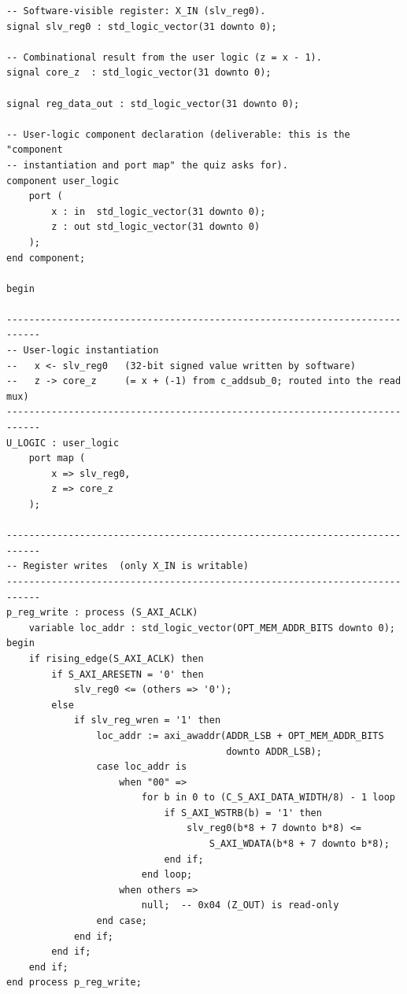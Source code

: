 \documentclass[11pt,letterpaper]{article}
\begin{document}
\begin{lstlisting}[caption={\texttt{add\_const\_axi\_v1\_0\_S00\_AXI.vhd} --
                   user\_logic component declaration, instantiation, and
                   read mux},label={lst:slv}]
-- Software-visible register: X_IN (slv_reg0).
signal slv_reg0 : std_logic_vector(31 downto 0);

-- Combinational result from the user logic (z = x - 1).
signal core_z  : std_logic_vector(31 downto 0);

signal reg_data_out : std_logic_vector(31 downto 0);

-- User-logic component declaration (deliverable: this is the "component
-- instantiation and port map" the quiz asks for).
component user_logic
    port (
        x : in  std_logic_vector(31 downto 0);
        z : out std_logic_vector(31 downto 0)
    );
end component;

begin

----------------------------------------------------------------------------
-- User-logic instantiation
--   x <- slv_reg0   (32-bit signed value written by software)
--   z -> core_z     (= x + (-1) from c_addsub_0; routed into the read mux)
----------------------------------------------------------------------------
U_LOGIC : user_logic
    port map (
        x => slv_reg0,
        z => core_z
    );

----------------------------------------------------------------------------
-- Register writes  (only X_IN is writable)
----------------------------------------------------------------------------
p_reg_write : process (S_AXI_ACLK)
    variable loc_addr : std_logic_vector(OPT_MEM_ADDR_BITS downto 0);
begin
    if rising_edge(S_AXI_ACLK) then
        if S_AXI_ARESETN = '0' then
            slv_reg0 <= (others => '0');
        else
            if slv_reg_wren = '1' then
                loc_addr := axi_awaddr(ADDR_LSB + OPT_MEM_ADDR_BITS
                                       downto ADDR_LSB);
                case loc_addr is
                    when "00" =>
                        for b in 0 to (C_S_AXI_DATA_WIDTH/8) - 1 loop
                            if S_AXI_WSTRB(b) = '1' then
                                slv_reg0(b*8 + 7 downto b*8) <=
                                    S_AXI_WDATA(b*8 + 7 downto b*8);
                            end if;
                        end loop;
                    when others =>
                        null;  -- 0x04 (Z_OUT) is read-only
                end case;
            end if;
        end if;
    end if;
end process p_reg_write;


\end{lstlisting}
\end{document}
